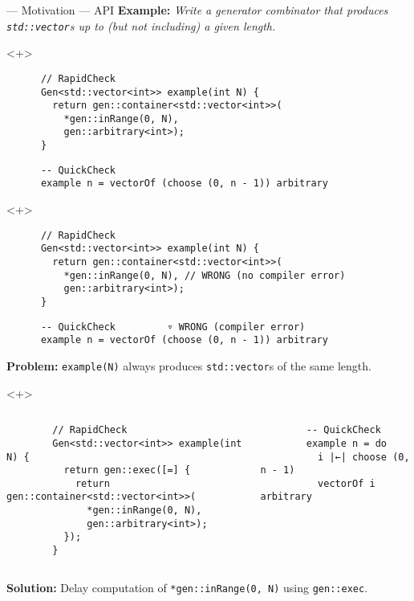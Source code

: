 \begin{frame}[fragile,t]{\halcheck{} --- Motivation --- API}
  \textbf{Example:} \emph{Write a generator combinator that produces \texttt{std::vector}s up to (but not including) a given length.}

  \begin{onlyenv}<+>
    \begin{verbatim}
      // RapidCheck
      Gen<std::vector<int>> example(int N) {
        return gen::container<std::vector<int>>(
          *gen::inRange(0, N),
          gen::arbitrary<int>);
      }
    \end{verbatim}

    \begin{verbatim}
      -- QuickCheck
      example n = vectorOf (choose (0, n - 1)) arbitrary
    \end{verbatim}
  \end{onlyenv}

  \begin{onlyenv}<+>
    \begin{verbatim}
      // RapidCheck
      Gen<std::vector<int>> example(int N) {
        return gen::container<std::vector<int>>(
          *gen::inRange(0, N), // WRONG (no compiler error)
          gen::arbitrary<int>);
      }
    \end{verbatim}

    \begin{verbatim}
      -- QuickCheck         ▿ WRONG (compiler error)
      example n = vectorOf (choose (0, n - 1)) arbitrary
    \end{verbatim}

    \textbf{Problem:} \texttt{example(N)} always produces \texttt{std::vector}s of the same length.
  \end{onlyenv}

  \begin{onlyenv}<+>
    \begin{columns}[T]
      \begin{verbatim}
        // RapidCheck
        Gen<std::vector<int>> example(int N) {
          return gen::exec([=] {
            return gen::container<std::vector<int>>(
              *gen::inRange(0, N),
              gen::arbitrary<int>);
          });
        }
      \end{verbatim}

      \begin{verbatim}
        -- QuickCheck
        example n = do
          i |←| choose (0, n - 1)
          vectorOf i arbitrary
      \end{verbatim}
    \end{columns}

    \textbf{Solution:} Delay computation of \texttt{*gen::inRange(0, N)} using \texttt{gen::exec}.
  \end{onlyenv}
\end{frame}

